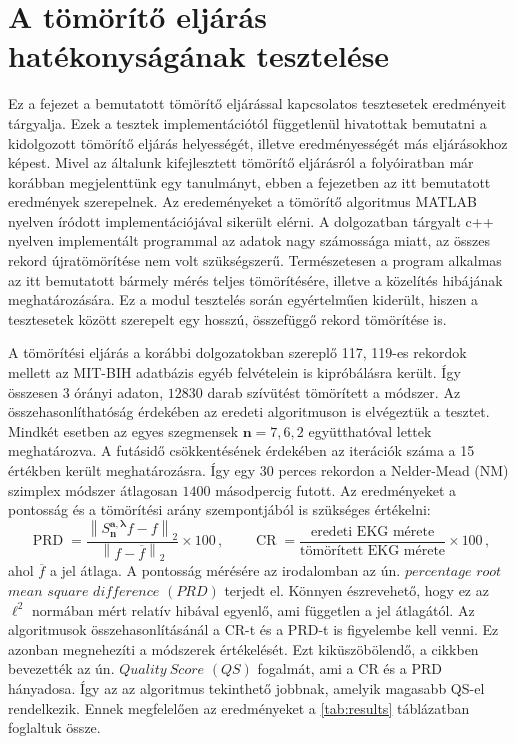 \documentclass[oneside,titlepage,12pt,a4paper]{report}
\DeclareMathOperator{\PRD}{PRD}
\DeclareMathOperator{\CR}{CR}
\newcommand{\conj}[1]{\overline{#1}}
\begin{document}
\section{A tömörítő eljárás hatékonyságának tesztelése} \label{sec:methodtest}

	Ez a fejezet a bemutatott tömörítő eljárással kapcsolatos tesztesetek eredményeit tárgyalja. Ezek a tesztek implementációtól függetlenül hivatottak bemutatni a kidolgozott tömörítő eljárás helyességét, illetve eredményességét más eljárásokhoz képest. Mivel az általunk kifejlesztett tömörítő eljárásról a \cite{sajat} folyóiratban már korábban megjelenttünk egy tanulmányt, ebben a fejezetben az itt bemutatott eredmények szerepelnek. Az eredeményeket a tömörítő algoritmus MATLAB nyelven íródott implementációjával sikerült elérni. A dolgozatban tárgyalt c++ nyelven implementált programmal az adatok nagy számossága miatt, az összes rekord újratömörítése nem volt szükségszerű. Természetesen a program alkalmas az itt bemutatott bármely mérés teljes tömörítésére, illetve a közelítés hibájának meghatározására. Ez a modul tesztelés során egyértelműen kiderült, hiszen a tesztesetek között szerepelt egy hosszú, összefüggő rekord tömörítése is. 
\par A tömörítési eljárás a korábbi \cite{origCikk, clusterMaps} dolgozatokban szereplő 117, 119-es rekordok mellett az MIT-BIH adatbázis egyéb felvételein is kipróbálásra került. Így összesen $3$ órányi adaton, $12830$ darab szívütést tömörített a módszer. Az összehasonlíthatóság érdekében az eredeti \cite{waveletOpt} algoritmuson is elvégeztük a tesztet. Mindkét esetben az egyes szegmensek $\mathbf{n}=7,6,2$ együtthatóval lettek meghatározva. A futásidő csökkentésének érdekében az iterációk száma a 15 értékben került meghatározásra. Így egy $30$ perces rekordon a Nelder-Mead (NM) szimplex módszer átlagosan $1400$ másodpercig futott. Az eredményeket a pontosság és a tömörítési arány szempontjából is szükséges értékelni:
\begin{equation*}
		\PRD=\frac{\left\|S_{\mathbf{n}}^{\mathbf{a},\boldsymbol{\lambda}}f-f\right\|_2}{\left\|f-\conj{f}\right\|_2}\times 100\,,\qquad  \CR=\frac{\text{eredeti EKG mérete}}{\text{tömörített EKG mérete}}\times 100\,,
		\label{eq:prd_cr}
\end{equation*}
ahol $\conj{f}$ a jel átlaga. A pontosság mérésére az irodalomban az ún. $percentage$ $root$ $mean$ $square$ $difference$ $(PRD)$ terjedt el. Könnyen észrevehető, hogy ez az $\ell^2$ normában mért relatív hibával egyenlő, ami független a jel átlagától. Az algoritmusok összehasonlításánál a CR-t és a PRD-t is figyelembe kell venni. Ez azonban megnehezíti a módszerek értékelését. Ezt kiküszöbölendő, a \cite{realTimeQrs} cikkben bevezették az ún. $Quality\ Score$ $(QS)$ fogalmát, ami a CR és a PRD hányadosa. Így az az algoritmus tekinthető jobbnak, amelyik magasabb QS-el rendelkezik. Ennek megfelelően az eredményeket a \ref{tab:results} táblázatban foglaltuk össze.
\end{document}
